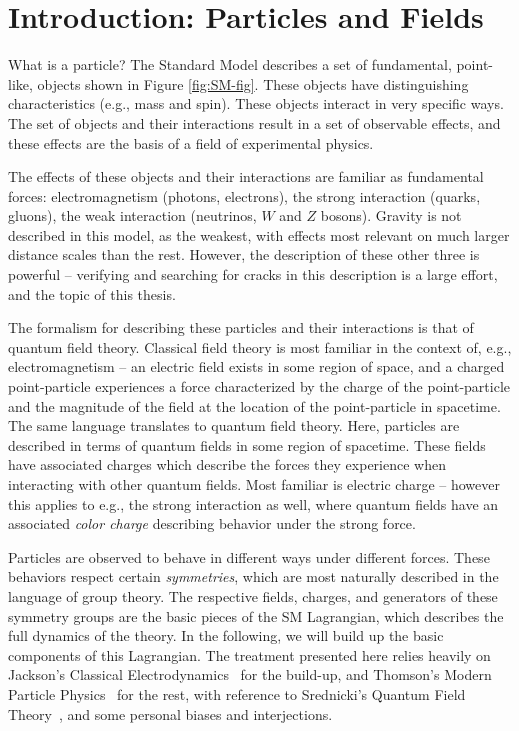 \section{Introduction: Particles and Fields}
What is a particle? The Standard Model describes a set of fundamental, point-like, objects shown in Figure \ref{fig:SM-fig}. 
These objects have distinguishing characteristics (e.g., mass and spin). These objects interact in very specific 
ways. The set of objects and their interactions result in a set of observable effects, and these effects are the basis of a field of experimental physics. 

The effects of these objects and their interactions are familiar as fundamental forces: electromagnetism (photons, 
electrons), the strong interaction (quarks, gluons), the weak interaction (neutrinos, $W$ and $Z$ bosons). Gravity is not 
described in this model, as the weakest, with effects most relevant on much larger distance scales than the rest. However, 
the description of these other three is powerful -- verifying and searching for cracks in this description is a large 
effort, and the topic of this thesis.

The formalism for describing these particles and their interactions is that of quantum field theory. Classical field theory is most familiar in the context of, e.g., electromagnetism -- an electric field exists in some region of space, and a charged point-particle experiences a force characterized by the charge of the point-particle and the magnitude of the field at the location of the point-particle in spacetime. The same language translates to quantum field theory. Here, particles are described in terms of quantum fields in some region of spacetime. These fields have associated charges which describe the forces they experience when interacting with other quantum fields. Most familiar is electric charge -- however this applies to e.g., the strong interaction as well, where quantum fields have an associated \emph{color charge} describing behavior under the strong force.

Particles are observed to behave in different ways under different forces. These behaviors respect certain \emph{symmetries}, which are most naturally described in the language of group theory. The respective fields, charges, and 
generators of these symmetry groups are the basic pieces of the SM Lagrangian, which describes the full dynamics of the theory. In the following, we will build up the basic components of this Lagrangian. The treatment presented here 
relies heavily on Jackson's Classical Electrodynamics~\cite{Jackson} for the build-up, and Thomson's Modern Particle 
Physics~\cite{Thomson} for the rest, with reference to Srednicki's Quantum Field Theory~\cite{Srednicki}, and some 
personal biases and interjections.

